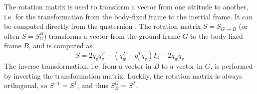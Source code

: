 

The rotation matrix is used to transform a vector from one attitude to another, i.e. for the transformation from the body-fixed frame to the inertial frame.
It can be computed directly from the quaternion \cite{zipfel2007, stevens2015}. 
The rotation matrix $S = S_{G \to B}$ (or often $S = S^B_G$) transforms a vector from the ground frame $G$ to the body-fixed frame $B$, and is computed as
\begin{equation}
    S = 2 q_v q_v^T + (q_w^2-q_v^T q_v) I_3 - 2 q_w \tilde q_v \label{eq:rotationmatrix}
\end{equation}
The inverse transformation, i.e. from a vector in $B$ to a vector in $G$, is performed by inverting the transformation matrix. 
Luckily, the rotation matrix is always orthogonal, so $S^{-1} = S^T$, and thus $S^G_B = S^T$.

